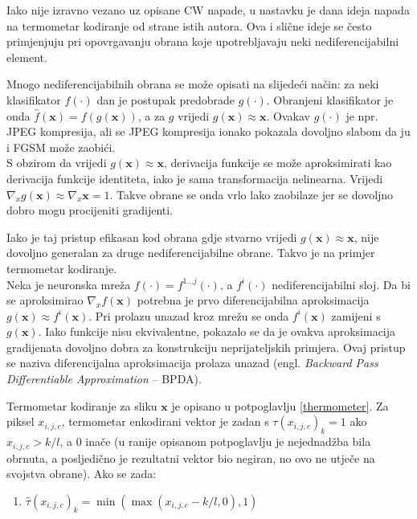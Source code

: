 \documentclass[utf8, diplomski]{fer}
\begin{document}
Iako nije izravno vezano uz opisane CW napade, u nastavku je dana ideja napada na termometar kodiranje od strane istih autora\citep{obfuscated}. Ova i slične ideje se često primjenjuju pri opovrgavanju obrana koje upotrebljavaju neki nediferencijabilni element. \par
Mnogo nediferencijabilnih obrana se može opisati na slijedeći način: za neki klasifikator $f(\cdot)$ dan je postupak predobrade $g(\cdot)$. Obranjeni klasifikator je onda $\hat{f}(\boldsymbol{x}) = f(g(\boldsymbol{x}))$, a za $g$ vrijedi $g(\boldsymbol{x}) \approx \boldsymbol{x}$. Ovakav $g(\cdot)$ je npr. JPEG kompresija, ali se JPEG kompresija ionako pokazala dovoljno slabom da ju i FGSM može zaobići. \\
S obzirom da vrijedi $g(\boldsymbol{x}) \approx \boldsymbol{x}$, derivacija funkcije se može aproksimirati kao derivacija funkcije identiteta, iako je sama transformacija nelinearna. Vrijedi $\nabla_{x}g(\boldsymbol{x}) \approx \nabla_{x} \boldsymbol{x} = 1$. Takve obrane se onda vrlo lako zaobilaze jer se dovoljno dobro mogu procijeniti gradijenti.
\par
Iako je taj pristup efikasan kod obrana gdje stvarno vrijedi $g(\boldsymbol{x}) \approx \boldsymbol{x}$, nije dovoljno generalan za druge nediferencijabilne obrane. Takvo je na primjer termometar kodiranje. \\
Neka je neuronska mreža $f(\cdot) = f^{1...j}(\cdot)$, a $f^{i}(\cdot)$ nediferencijabilni sloj. Da bi se aproksimirao $\nabla_{x}f(\boldsymbol{x})$ potrebna je prvo diferencijabilna aproksimacija $g(\boldsymbol{x}) \approx f^{i}(\boldsymbol{x})$. Pri prolazu unazad kroz mrežu se onda $f^{i}(\boldsymbol{x})$ zamijeni s $g(\boldsymbol{x})$. Iako funkcije nisu ekvivalentne, pokazalo se da je ovakva aproksimacija gradijenata dovoljno dobra za konstrukciju neprijateljskih primjera. Ovaj pristup se naziva diferencijalna aproksimacija prolaza unazad (engl. \textit{Backward Pass Differentiable Approximation} -- BPDA).
\par
Termometar kodiranje za sliku $\boldsymbol{x}$ je opisano u potpoglavlju \ref{thermometer}. Za piksel $x_{i,j,c}$, termometar enkodirani vektor je zadan s $\tau(x_{i, j, c})_{k} = 1$ ako $x_{i,j,c} > k/l$, a $0$ inače (u ranije opisanom potpoglavlju je nejednadžba bila obrnuta, a posljedično je rezultatni vektor bio negiran, no ovo ne utječe na svojstva obrane). Ako se zada:

\begin{enumerate}[topsep=0pt,parsep=0pt,partopsep=0pt, label={}]
	\item $\hat{\tau} (x_{i, j, c})_{k} = \min(\max(x_{i,j,c} - k/l, 0), 1)$
\end{enumerate}
\end{document}
